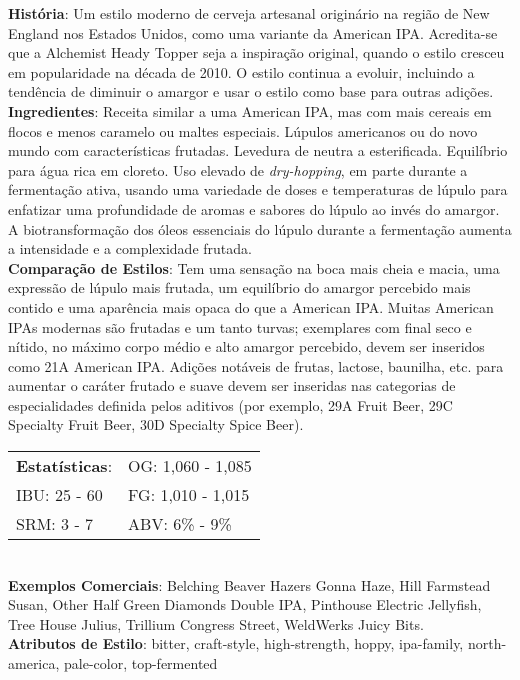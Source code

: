 \textbf{História}: Um estilo moderno de cerveja artesanal originário na região de New England nos Estados Unidos, como uma variante da American IPA. Acredita-se que a Alchemist Heady Topper seja a inspiração original, quando o estilo cresceu em popularidade na década de 2010. O estilo continua a evoluir, incluindo a tendência de diminuir o amargor e usar o estilo como base para outras adições. \\
\textbf{Ingredientes}: Receita similar a uma American IPA, mas com mais cereais em flocos e menos caramelo ou maltes especiais. Lúpulos americanos ou do novo mundo com características frutadas. Levedura de neutra a esterificada. Equilíbrio para água rica em cloreto. Uso elevado de \textit{dry-hopping}, em parte durante a fermentação ativa, usando uma variedade de doses e temperaturas de lúpulo para enfatizar uma profundidade de aromas e sabores do lúpulo ao invés do amargor. A biotransformação dos óleos essenciais do lúpulo durante a fermentação aumenta a intensidade e a complexidade frutada. \\
\textbf{Comparação de Estilos}: Tem uma sensação na boca mais cheia e macia, uma expressão de lúpulo mais frutada, um equilíbrio do amargor percebido mais contido e uma aparência mais opaca do que a American IPA. Muitas American IPAs modernas são frutadas e um tanto turvas; exemplares com final seco e nítido, no máximo corpo médio e alto amargor percebido, devem ser inseridos como 21A American IPA. Adições notáveis de frutas, lactose, baunilha, etc. para aumentar o caráter frutado e suave devem ser inseridas nas categorias de especialidades definida pelos aditivos (por exemplo, 29A Fruit Beer, 29C Specialty Fruit Beer, 30D Specialty Spice Beer). \\
\begin{tabular}{@{}p{35mm}p{35mm}@{}}
  \textbf{Estatísticas}: & OG: 1,060 - 1,085 \\
  IBU: 25 - 60  & FG: 1,010 - 1,015 \\
  SRM: 3 - 7  & ABV: 6\% - 9\%
\end{tabular}\\
\textbf{Exemplos Comerciais}: Belching Beaver Hazers Gonna Haze, Hill Farmstead Susan, Other Half Green Diamonds Double IPA, Pinthouse Electric Jellyfish, Tree House Julius, Trillium Congress Street, WeldWerks Juicy Bits. \\
\textbf{Atributos de Estilo}: bitter, craft-style, high-strength, hoppy, ipa-family, north-america, pale-color, top-fermented
